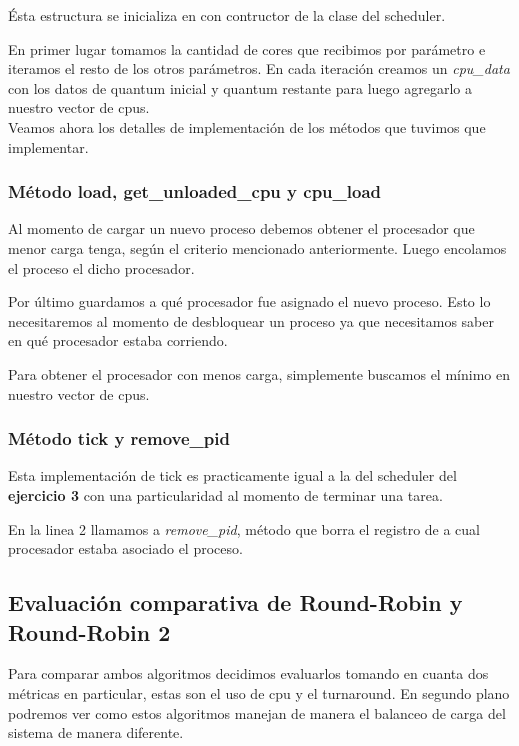 \documentclass[a4paper,11pt]{article}
\begin{document}
			Ésta estructura se inicializa en con contructor de la clase del scheduler.

			

			En primer lugar tomamos la cantidad de cores que recibimos por parámetro e iteramos el resto de los otros parámetros. En cada iteración creamos un \textit{cpu\_data} con los datos de quantum inicial y quantum restante para luego agregarlo a nuestro vector de cpus.\\
			
			Veamos ahora los detalles de implementación de los métodos que tuvimos que implementar.
			
		\subsubsection*{Método load, get\_unloaded\_cpu y cpu\_load}
			Al momento de cargar un nuevo proceso debemos obtener el procesador que menor carga tenga, según el criterio mencionado anteriormente. Luego encolamos el proceso el dicho procesador.
	
						
			
			Por último guardamos a qué procesador fue asignado el nuevo proceso. Esto lo necesitaremos al momento de desbloquear un proceso ya que necesitamos saber en qué procesador estaba corriendo.
			
			Para obtener el procesador con menos carga, simplemente buscamos el mínimo en nuestro vector de cpus.
	
			
			
		\subsubsection*{Método tick y remove\_pid}
			Esta implementación de tick es practicamente igual a la del scheduler del \textbf{ejercicio 3} con una particularidad al momento de terminar una tarea.
	
			
			
			En la linea 2 llamamos a \textit{remove\_pid}, método que borra el registro de a cual procesador estaba asociado el proceso.
	\subsection{Evaluación comparativa de Round-Robin y Round-Robin 2}
		Para comparar ambos algoritmos decidimos evaluarlos tomando en cuanta dos métricas en particular, estas son el uso de cpu y el turnaround. En segundo plano podremos ver como estos algoritmos manejan de manera el balanceo de carga del sistema de manera diferente.
		
\end{document}
